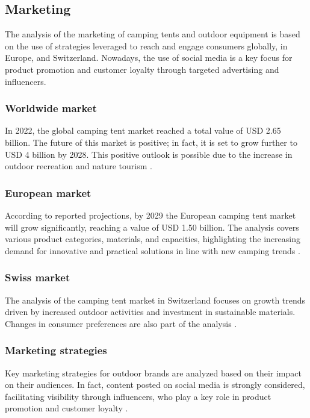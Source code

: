 \documentclass{article}
\begin{document}
\subsection{Marketing}
The analysis of the marketing of camping tents and outdoor equipment is based on the use
of strategies leveraged to reach and engage consumers globally, in Europe, and Switzerland.
Nowadays, the use of social media is a key focus for product promotion and customer
loyalty through targeted advertising and influencers.

\subsubsection{Worldwide market}
In 2022, the global camping tent market reached a total value of USD 2.65 billion.
The future of this market is positive; in fact, it is set to grow further to USD 4 billion
by 2028. This positive outlook is possible due to the increase in outdoor recreation and
nature tourism \parencite{expertmarket2023}.

\subsubsection{European market}
According to reported projections, by 2029 the European camping tent market will grow
significantly, reaching a value of USD 1.50 billion. The analysis covers various product
categories, materials, and capacities, highlighting the increasing demand for innovative
and practical solutions in line with new camping trends \parencite{arizton2024}.

\subsubsection{Swiss market}
The analysis of the camping tent market in Switzerland focuses on growth trends driven by
increased outdoor activities and investment in sustainable materials. Changes in consumer
preferences are also part of the analysis \parencite{6wresearch2023}.

\subsubsection{Marketing strategies}
Key marketing strategies for outdoor brands are analyzed based on their impact on their
audiences. In fact, content posted on social media is strongly considered, facilitating
visibility through influencers, who play a key role in product promotion and customer
loyalty \parencite{guestcolumn2024}.
\end{document}
